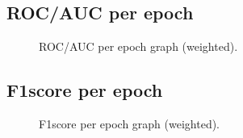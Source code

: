 \documentclass[a4paper,oneside,11pt]{book}
\begin{document}
\subsection{ROC/AUC per epoch}
\begin{figure}[H]
    \centering
    \caption{ROC/AUC per epoch graph (weighted).}
\end{figure}
\subsection{F1score per epoch}
\begin{figure}[H]
    \centering
    \caption{F1score per epoch graph (weighted).}
\end{figure}
\end{document}
